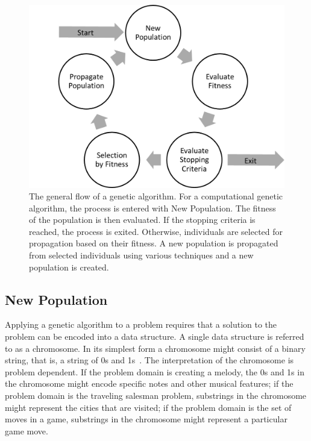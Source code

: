 \begin{figure}[htp]
\centerline{\includegraphics[width=1.0\columnwidth]{Figures/GAFlow.png}}
\caption[Genetic Algorithm Flow]{The general flow of a genetic algorithm. For a
computational genetic algorithm, the process is entered with New Population.
The fitness of the population is then evaluated. If the stopping criteria is
reached, the process is exited. Otherwise, individuals are selected for
propagation based on their fitness. A new population is propagated from
selected individuals using various techniques and a new population is created.}
\label{figure-gaflow}
\end{figure}

\subsection{New Population}

Applying a genetic algorithm to a problem requires that a solution to the
problem can be encoded into a data structure. A single data structure is
referred to as a chromosome. In its simplest form a chromosome might consist of
a binary string, that is, a string of 0s and
1s~\cite{Holland1992,goldberg1989genetic}.
The interpretation of the chromosome is problem dependent. If the problem domain
is creating a melody, the 0s and 1s in the chromosome might encode specific
notes and other musical features; if the problem domain is the traveling
salesman problem, substrings in the chromosome might represent the cities that
are visited; if the problem domain is the set of moves in a game, substrings in
the chromosome might represent a particular game move.

